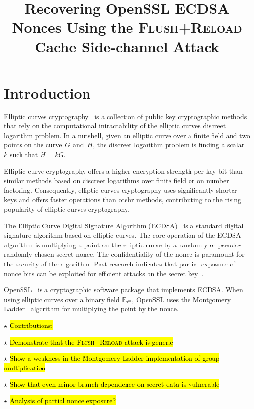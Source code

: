 \documentclass{llncs}
\newcommand{\starpar}[1]{\par{\footnotesize $\star$ \hl{#1}\par}}
\begin{document}
\title{Recovering OpenSSL ECDSA Nonces Using the \textsc{Flush+Reload} Cache Side-channel Attack}

\maketitle

\begin{abstract}
\end{abstract}

\section{Introduction}
Elliptic curves cryptography~\cite{miller85use,koblitz87elliptic} is a collection of public key cryptographic methods that rely on the computational
intractability of the elliptic curves discreet logarithm problem.
In a nutshell, given an elliptic curve over a finite field and two points on the curve~$G$ and~$H$,
the discreet logarithm problem is finding a scalar $k$ such that $H=kG$.

Elliptic curve cryptography offers a higher encryption strength per key-bit than similar methods based on 
discreet logarithms over finite field or on number factoring.
Consequently, elliptic curves cryptography uses significantly shorter keys and offers faster operations
than otehr methods, contributing to the rising popularity of elliptic curves cryptography.

The Elliptic Curve Digital Signature Algorithm (ECDSA)~\cite{johnson01elliptic,fips186,ansi962} is a standard
digital signature algorithm based on elliptic curves.
The core operation of the ECDSA algorithm is multiplying a point on the elliptic curve by a randomly
or pseudo-randomly chosen secret nonce.
The confidentiality of the nonce is paramount for the security of the algorithm.
Past research indicates that partial exposure of nonce bits can be exploited for efficient attacks on the secret key~\cite{nguyen03insecurity,brumley11remote}.

OpenSSL~\cite{openssl} is a cryptographic software package that implements ECDSA.
When using elliptic curves over a binary field $\mathbb{F}_{2^m}$, OpenSSL uses the 
Montgomery Ladder~\cite{montgomery87speeding,joye03montgomery} algorithm for multiplying the point by the nonce.






\starpar{Contributions:}
\starpar{Demonstrate that the \textsc{Flush+Reload} attack is generic}
\starpar{Show a weakness in the Montgomery Ladder implementation of group multiplication}
\starpar{Show that even minor branch dependence on secret data is vulnerable}
\starpar{Analysis of partial nonce exposure?}
\end{document}
